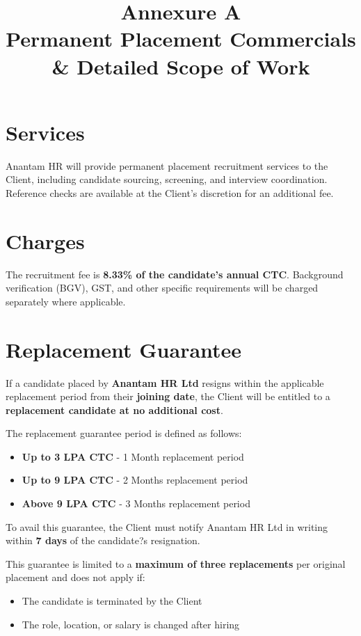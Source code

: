 \documentclass[12pt]{article}
\title{
\vspace{-1cm}
\textcolor{primary}{\Huge \textbf{Annexure A}} \\
\vspace{0.4cm}
\Large Permanent Placement Commercials \\
\Large \& Detailed Scope of Work
}
\date{}
\begin{document}
\maketitle
\thispagestyle{fancy}


\section{Services}

Anantam HR will provide permanent placement recruitment services to the Client, including candidate sourcing, screening, and interview coordination. Reference checks are available at the Client's discretion for an additional fee.

\section{Charges}

The recruitment fee is \textbf{8.33\% of the candidate's annual CTC}. Background verification (BGV), GST, and other specific requirements will be charged separately where applicable.

\section{Replacement Guarantee}

If a candidate placed by \textbf{Anantam HR Ltd} resigns within the applicable replacement period from their \textbf{joining date}, the Client will be entitled to a \textbf{replacement candidate at no additional cost}.

The replacement guarantee period is defined as follows:

\begin{itemize}[leftmargin=1.2cm]
\item \textbf{Up to 3 LPA CTC} - 1 Month replacement period
\item \textbf{Up to 9 LPA CTC} - 2 Months replacement period
\item \textbf{Above 9 LPA CTC} - 3 Months replacement period
\end{itemize}

To avail this guarantee, the Client must notify Anantam HR Ltd in writing within \textbf{7 days} of the candidate?s resignation.

This guarantee is limited to a \textbf{maximum of three replacements} per original placement and does not apply if:

\begin{itemize}
\item The candidate is terminated by the Client
\item The role, location, or salary is changed after hiring
\end{itemize}
\end{document}
